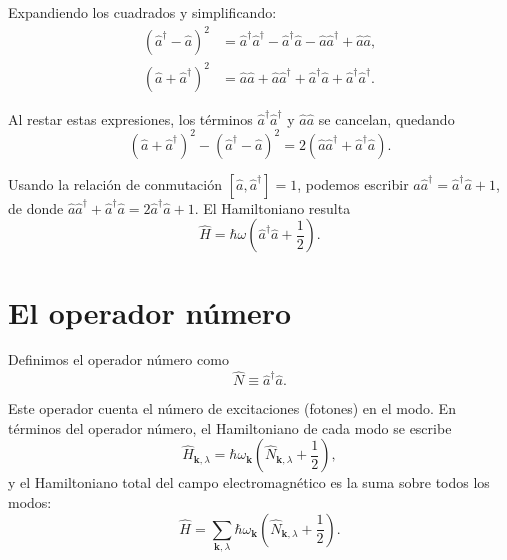         Expandiendo los cuadrados y simplificando:
        \begin{align}
            (\hat{a}^\dagger - \hat{a})^2 &= \hat{a}^\dagger\hat{a}^\dagger - \hat{a}^\dagger\hat{a} - \hat{a}\hat{a}^\dagger + \hat{a}\hat{a}, \\
            (\hat{a} + \hat{a}^\dagger)^2 &= \hat{a}\hat{a} + \hat{a}\hat{a}^\dagger + \hat{a}^\dagger\hat{a} + \hat{a}^\dagger\hat{a}^\dagger.
        \end{align}
        
        Al restar estas expresiones, los términos $\hat{a}^\dagger\hat{a}^\dagger$ y $\hat{a}\hat{a}$ se cancelan, quedando
        \begin{equation}
            (\hat{a} + \hat{a}^\dagger)^2 - (\hat{a}^\dagger - \hat{a})^2 = 2(\hat{a}\hat{a}^\dagger + \hat{a}^\dagger\hat{a}).
        \end{equation}
        
        Usando la relación de conmutación $[\hat{a}, \hat{a}^\dagger] = 1$, podemos escribir $\hat{a}\hat{a}^\dagger = \hat{a}^\dagger\hat{a} + 1$, de donde $\hat{a}\hat{a}^\dagger + \hat{a}^\dagger\hat{a} = 2\hat{a}^\dagger\hat{a} + 1$. El Hamiltoniano resulta
        \begin{equation}
            \hat{H} = \hbar\omega\left(\hat{a}^\dagger\hat{a} + \frac{1}{2}\right).
        \end{equation}
        
    \section{El operador número}
        
        Definimos el operador número como
        \begin{equation}
            \hat{N} \equiv \hat{a}^\dagger\hat{a}.
        \end{equation}
        
        Este operador cuenta el número de excitaciones (fotones) en el modo. En términos del operador número, el Hamiltoniano de cada modo se escribe
        \begin{equation}
            \hat{H}_{\mathbf{k},\lambda} = \hbar\omega_{\mathbf{k}}\left(\hat{N}_{\mathbf{k},\lambda} + \frac{1}{2}\right),
        \end{equation}
        y el Hamiltoniano total del campo electromagnético es la suma sobre todos los modos:
        \begin{equation}
            \hat{H} = \sum_{\mathbf{k},\lambda} \hbar\omega_{\mathbf{k}}\left(\hat{N}_{\mathbf{k},\lambda} + \frac{1}{2}\right).
        \end{equation}
        
